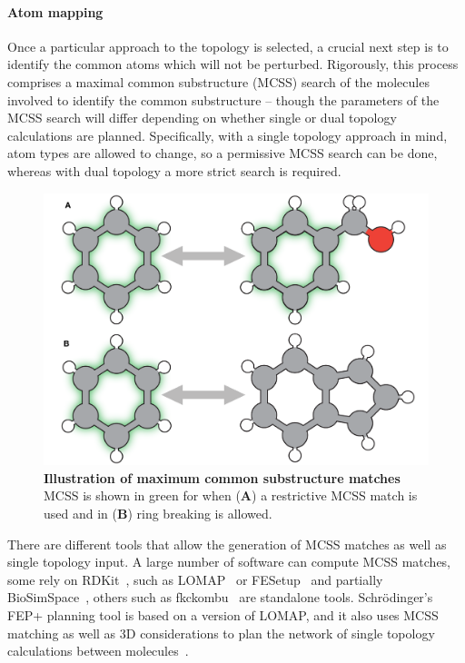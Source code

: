 \documentclass[9pt,bestpractices]{livecoms}
\begin{document}
\paragraph{Atom mapping}
Once a particular approach to the topology is selected, a crucial next step is to identify the common atoms which will not be perturbed.
Rigorously, this process comprises a maximal common substructure (MCSS) search of the molecules involved to identify the common substructure -- though the parameters of the MCSS search will differ depending on whether single or dual topology calculations are planned.
Specifically, with a single topology approach in mind, atom types are allowed to change, so a permissive MCSS search can be done, whereas with dual topology a more strict search is required.
\begin{figure}
    \includegraphics[width=0.95\linewidth]{figures/fig4_mcs/Figure.pdf}
    \caption{\textbf{Illustration of maximum common substructure matches} MCSS is shown in green for when (\textbf{A}) a restrictive MCSS match is used and in (\textbf{B}) ring breaking is allowed.}
    \label{fig:fig_mcss}
\end{figure} 
%
There are different tools that allow the generation of MCSS matches as well as single topology input. A large number of software can compute MCSS matches, some rely on RDKit~\cite{rdkit2019Dec}, such as LOMAP~\cite{liu2013lead} or FESetup~\cite{loeffler2015fesetup} and partially BioSimSpace~\cite{hedges2019biosimspace}, others such as fkckombu~\cite{kawabata20143d} are standalone tools. Schr\"{o}dinger's FEP+ planning tool is based on a version of LOMAP, and it also uses MCSS matching as well as 3D considerations to plan the network of single topology calculations between molecules~\cite{wang2015accurate}. 
\end{document}
